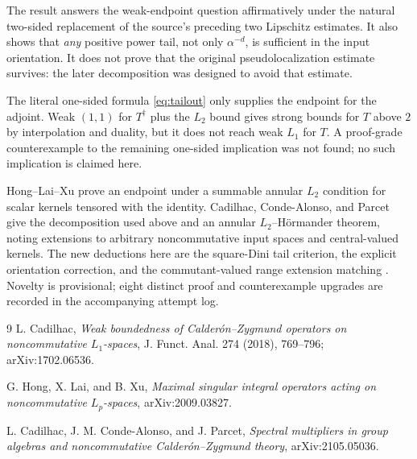 \documentclass[11pt]{article}
\begin{document}
The result answers the weak-endpoint question affirmatively under the natural
two-sided replacement of the source's preceding two Lipschitz estimates.  It
also shows that \emph{any} positive power tail, not only $\alpha^{-d}$, is
sufficient in the input orientation.  It does not prove that the original
pseudolocalization estimate survives: the later decomposition was designed
to avoid that estimate.

The literal one-sided formula \eqref{eq:tailout} only supplies the endpoint
for the adjoint.  Weak $(1,1)$ for $T^\dagger$ plus the $L_2$ bound gives
strong bounds for $T$ above $2$ by interpolation and duality, but it does not
reach weak $L_1$ for $T$.  A proof-grade counterexample to the remaining
one-sided implication was not found; no such implication is claimed here.

Hong--Lai--Xu \cite{hlx} prove an endpoint under a summable annular $L_2$
condition for scalar kernels tensored with the identity.  Cadilhac,
Conde-Alonso, and Parcet \cite{ccap} give the decomposition used above and an
annular $L_2$--H\"ormander theorem, noting extensions to arbitrary
noncommutative input spaces and central-valued kernels.  The new deductions
here are the square-Dini tail criterion, the explicit orientation correction,
and the commutant-valued range extension matching \cite{source}.  Novelty is
provisional; eight distinct proof and counterexample upgrades are recorded in
the accompanying attempt log.

\begin{thebibliography}{9}
L. Cadilhac,
\emph{Weak boundedness of Calder\'on--Zygmund operators on noncommutative
$L_1$-spaces}, J. Funct. Anal. 274 (2018), 769--796;
arXiv:1702.06536.

G. Hong, X. Lai, and B. Xu,
\emph{Maximal singular integral operators acting on noncommutative
$L_p$-spaces}, arXiv:2009.03827.

L. Cadilhac, J. M. Conde-Alonso, and J. Parcet,
\emph{Spectral multipliers in group algebras and noncommutative
Calder\'on--Zygmund theory}, arXiv:2105.05036.
\end{thebibliography}
\end{document}
